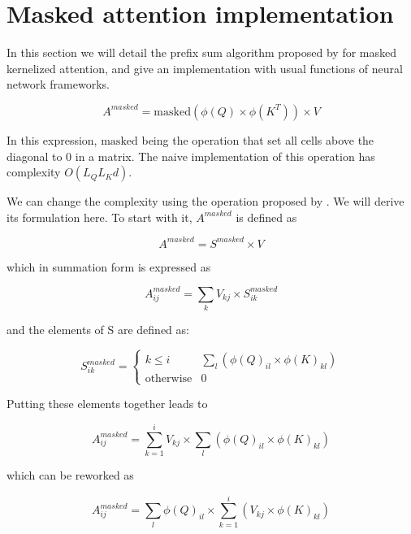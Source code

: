 \section{Masked attention
implementation}

In this section we will detail the prefix sum algorithm proposed by
\citet{choromanski2021rethinking} for
 masked kernelized attention, and give an implementation with usual
functions of neural network frameworks.

\begin{equation}
A^{masked} = \mathrm{masked} \left( \phi(Q) \times \phi(K^T) \right) \times V
\end{equation}

In this expression, $\mathrm{masked}$ being the operation that set all cells
 above the diagonal to 0 in a matrix. The naive implementation of this
 operation has complexity $O(L_QL_Kd)$.

We can change the complexity using the operation proposed by
 \citet{choromanski2021rethinking}. We
 will derive its formulation here.
 To start with it, $A^{masked}$ is defined as

\begin{equation}
A^{masked} = S^{masked} \times V
\end{equation}

\noindent{}which
in summation form is expressed as

\begin{equation}
A^{masked}_{ij} = \sum_k V_{kj} \times S^{masked}_{ik}
\end{equation}

\noindent{}and the
elements of S are defined as:

\begin{equation}
S^{masked}_{ik} =
\begin{cases}
k \leq i & \sum_l \left( \phi(Q)_{il} \times \phi(K)_{kl} \right) \\
\text{otherwise} &{}0 
\end{cases}
\end{equation}

Putting these elements together leads to

\begin{equation}
A^{masked}_{ij}= \sum_{k=1}^i V_{kj} \times \sum_l \left( \phi(Q)_{il} \times \phi(K)_{kl} \right)
\end{equation}

\noindent{}which can be reworked as

\begin{equation}
A^{masked}_{ij}= \sum_l \phi(Q)_{il} \times \sum_{k=1}^i \left(V_{kj} \times \phi(K)_{kl} \right)
\end{equation}

